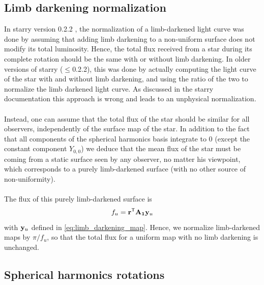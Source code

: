 \documentclass[modern]{aastex631}
\begin{document}
\subsection{Limb darkening normalization}
In \textsf{starry} version 0.2.2 \citep{starry}, the normalization of a limb-darkened light curve was done by assuming that adding limb darkening to a non-uniform surface does not modify its total luminosity. Hence, the total flux received from a star during its complete rotation should be the same with or without limb darkening. In older versions of starry ($\le$0.2.2), this was done by actually computing the light curve of the star with and without limb darkening, and using the ratio of the two to normalize the limb darkened light curve. As discussed in the \textsf{starry} documentation this approach is wrong and leads to an unphysical normalization.\\\\
Instead, one can assume that the total flux of the star should be similar for all observers, independently of the surface map of the star. In addition to the fact that all components of the spherical harmonics basis integrate to 0 (except the constant component $Y_{0,0}$) we deduce that the mean flux of the star must be coming from a static surface seen by any observer, no matter his viewpoint, which corresponds to a purely limb-darkened surface (with no other source of non-uniformity).\\\\
The flux of this purely limb-darkened surface is
\begin{equation}
    f_u = \bvec{r}^\mathsf{T}\bvec{A_1}\bvec{y}_u
\end{equation}
with ${\mathbf{y}}_u$ defined in \autoref{eq:limb_darkening_map}. Hence, we normalize limb-darkened maps by $\pi/f_u$, so that the total flux for a uniform map with no limb darkening is unchanged.


\subsection{Spherical harmonics rotations}

\end{document}

